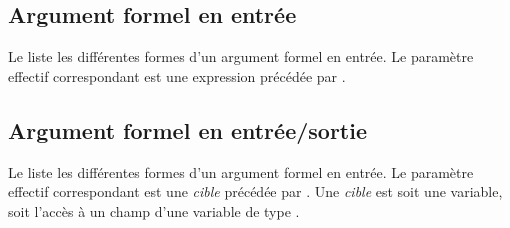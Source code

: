 
\subsection{Argument formel en entrée}

Le  liste les différentes formes d'un argument formel en entrée. Le paramètre effectif correspondant est une expression précédée par \galgas{\!}.

\begin{table}[t]
  \centering
  \caption{Argument formel en entrée, paramètre effectif en sortie}
  \ligne
\end{table}

\subsection{Argument formel en entrée/sortie}

Le  liste les différentes formes d'un argument formel en entrée. Le paramètre effectif correspondant est une \emph{cible} précédée par . Une \emph{cible} est soit une variable, soit l'accès à un champ d'une variable de type .

